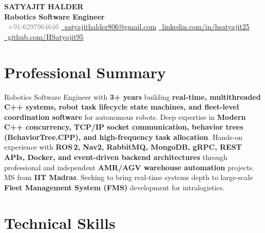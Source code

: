 \documentclass[a4paper,10pt]{article}
\begin{document}
\begin{center}
  {\Huge\bfseries\color{DarkNavy} SATYAJIT HALDER}\\[3pt]
  {\large\color{AccentBlue}\textbf{Robotics Software Engineer}}\\[4pt]
  \small\textcolor{SlateGray}{
    \faPhone\ +91-6297964646 \quad
    \href{mailto:satyajithalder806@gmail.com}{\faEnvelope\ satyajithalder806@gmail.com} \quad
    \href{https://www.linkedin.com/in/hsatyajit25/}{\faLinkedin\ linkedin.com/in/hsatyajit25} \quad
    \href{https://github.com/HSatyajit95}{\faGithub\ github.com/HSatyajit95}
  }
\end{center}

\vspace{-4pt}

\section{Professional Summary}
\small\color{SlateGray}
Robotics Software Engineer with \textbf{3+ years} building \textbf{real-time, multithreaded C++ systems, robot task lifecycle state machines, and fleet-level coordination software} for autonomous robots. Deep expertise in \textbf{Modern C++ concurrency, TCP/IP socket communication, behavior trees (BehaviorTree.CPP), and high-frequency task allocation}. Hands-on experience with \textbf{ROS\,2, Nav2, RabbitMQ, MongoDB, gRPC, REST APIs, Docker, and event-driven backend architectures} through professional and independent \textbf{AMR/AGV warehouse automation} projects. MS from \textbf{IIT Madras}. Seeking to bring real-time systems depth to large-scale \textbf{Fleet Management System (FMS)} development for intralogistics.

\vspace{-2pt}

\section{Technical Skills}
\end{document}
